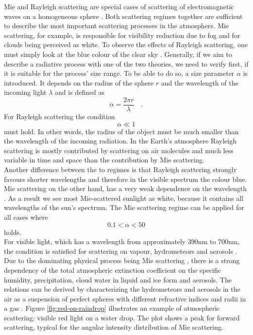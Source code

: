 Mie and Rayleigh scattering are special cases of scattering of electromagnetic waves on a homogeneous sphere \cite{hulst1957light}. Both scattering regimes together are sufficient to describe the most important scattering processes in the atmosphere.  Mie scattering, for example, is responsible for visibility reduction due to fog and for clouds being perceived as white. To observe the effects of Rayleigh scattering, one must simply look at the  blue colour of the clear sky \cite{wallace2006atmospheric}. 
Generally, if we aim to describe a radiative process with one of the two theories, we need to verify first, if it is suitable for the process' size range. To be able to do so, a size parameter $\alpha$ is introduced. It depends on the radius of the sphere $r$ and the wavelength of the incoming light $\lambda$ and is defined as
\begin{equation}
    \alpha = \frac{ 2 \pi r }{\lambda} \quad .
\end{equation}
For Rayleigh scattering the condition
\begin{equation}
    \alpha \ll 1
    \label{eq:Rayleighcon}
\end{equation} must hold. In other words, the radius of the object must be much smaller than the wavelength of the incoming radiation.
In the Earth's atmosphere Rayleigh scattering is mostly contributed by scattering on air molecules and much less variable in time and space than the contribution by Mie scattering. \\
Another difference between the to regimes is that Rayleigh scattering strongly favours shorter wavelengths and therefore in the visible spectrum the colour blue. Mie scattering on the other hand, has a very weak dependence on the wavelength \cite{raith2001erde}. As a result we see most Mie-scattered sunlight as white, because it contains all wavelengths of the sun's spectrum.
The Mie scattering regime can be applied for all cases where 
\begin{equation}
     0.1<\alpha<50
     \label{eq:Miecondition}
\end{equation}
holds. \\
For visible light, which has a wavelength from approximately 390nm to 700nm,  the condition is satisfied for scattering on vapour, hydrometeors and aerosols \parencite{wallace2006atmospheric, chandrasekar2010basics}.
Due to the dominating physical process being Mie scattering  \parencite{price2007advanced}, there is a strong dependency of the total atmospheric extinction coefficient on the specific humidity, precipitation, cloud water in liquid and ice form and aerosols. The relations can be derived by characterizing the hydrometeors and aerosols in the air as a suspension of perfect spheres with different refractive indices and radii in a gas \cite{lang2010interaction}. Figure \ref{fig:red-on-raindrop} illustrates an example of atmospheric scattering: visible red light on a water drop. The plot shows a peak for forward scattering, typical for the angular intensity distribution of Mie scattering.
